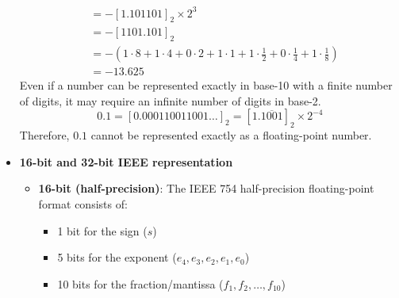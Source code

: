 \documentclass{report}
\begin{document}
\begin{itemize}
\begin{align*}
           & = -[1.101101]_2 \times 2^{3} \\
           & = -[1101.101]_2 \\
           & = -\left(1 \cdot 8 + 1 \cdot 4 + 0 \cdot 2 + 1 \cdot 1 + 1 \cdot \frac{1}{2} + 0 \cdot \frac{1}{4} + 1 \cdot \frac{1}{8}\right)  \\
           & = -13.625
     \end{align*}
     \bigbreak \noindent 
     Even if a number can be represented exactly in base-10 with a finite number of digits, it may require an infinite number of digits in base-2.
     $$
     0.1 = \left[0.000110011001\ldots\right]_2 = \left[1.\overline{1001}\right]_2 \times 2^{-4}
     $$
     Therefore, $0.1$ cannot be represented exactly as a floating-point number.
    \item \textbf{16-bit and 32-bit IEEE representation}
        \begin{itemize}
            \item \textbf{16-bit (half-precision)}: The IEEE 754 half-precision floating-point format consists of:
                \begin{itemize}
                    \item 1 bit for the sign (\(s\))
                    \item 5 bits for the exponent (\(e_4, e_3, e_2, e_1, e_0\))
                    \item 10 bits for the fraction/mantissa (\(f_1, f_2, \ldots, f_{10}\))
                \end{itemize}


\end{itemize}
\end{itemize}
\end{document}
